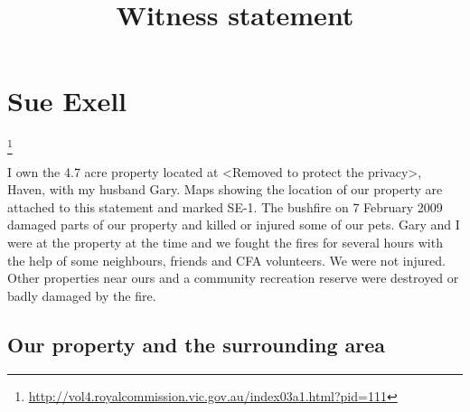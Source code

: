 \documentclass[a4paper]{article}
\title{Witness statement}
\begin{document}
	\maketitle
    \tableofcontents
    \newpage

\section{Sue Exell}

    \let\thefootnote\relax\footnote{\url{http://vol4.royalcommission.vic.gov.au/index03a1.html?pid=111}}

    I own the 4.7 acre property located at <Removed to protect the privacy>, Haven, with my husband Gary. Maps showing the location of our property are attached to this statement and marked SE-1. The bushfire on 7 February 2009 damaged parts of our property and killed or injured some of our pets. Gary and I were at the property at the time and we fought the fires for several hours with the help of some neighbours, friends and CFA volunteers. We were not injured. Other properties near ours and a community recreation reserve were destroyed or badly damaged by the fire.

\subsection{Our property and the surrounding area}
\end{document}
